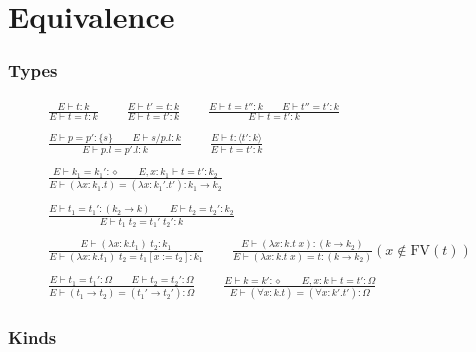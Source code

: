 \documentclass[twoside]{article}
\newcommand{\f}[1]{\mbox{#1}}
\begin{document}
\section{Equivalence}
\label{equivalence}

\subsubsection*{Types \hfill
{}
}

\begin{displaymath}
\begin{array}{c}
\displaystyle
\frac{
E \vdash t : k
}{
E \vdash t = t : k
}
\qquad
\frac{
E \vdash t' = t : k
}{
E \vdash t = t' : k
}
\qquad
\frac{
E \vdash t = t'' : k
\qquad
E \vdash t'' = t' : k
}{
E \vdash t = t' : k
}
\\\\\displaystyle
\frac{
E \vdash p = p' : \{s\}
\qquad
E \vdash s/p.l : k
}{
E \vdash p.l = p'.l : k
}
\qquad
\frac{
E \vdash t : \langle t':k\rangle
}{
E \vdash t = t' : k
}
\\\\\displaystyle
\frac{
E \vdash k_1 = k_1' : \diamond
\qquad
E,x:k_1 \vdash t = t' : k_2
}{
E \vdash (\lambda x:k_1.t) = (\lambda x:k_1'.t') : k_1\to k_2
}
\\\\\displaystyle
\frac{
E \vdash t_1 = t_1' : (k_2\to k)
\qquad
E \vdash t_2 = t_2' : k_2
}{
E \vdash t_1\;t_2 = t_1'\;t_2' : k
}
\\\\\displaystyle
\frac{
E \vdash (\lambda x:k.t_1)\;t_2 : k_1
}{
E \vdash (\lambda x:k.t_1)\;t_2 = t_1[x:=t_2] : k_1
}
\qquad
\frac{
E \vdash (\lambda x:k.t\;x) : (k\to k_2)
}{
E \vdash (\lambda x:k.t\;x) = t : (k\to k_2)
}(x \notin \f{FV}(t))
\\\\\displaystyle
\frac{
E \vdash t_1 = t_1' : \Omega
\qquad
E \vdash t_2 = t_2' : \Omega
}{
E \vdash (t_1\to t_2) = (t_1'\to t_2') : \Omega
}
\qquad
\frac{
E \vdash k = k' : \diamond
\qquad
E,x:k \vdash t = t' : \Omega
}{
E \vdash (\forall x:k.t) = (\forall x:k'.t') : \Omega
}
\end{array}
\end{displaymath}



\subsubsection*{Kinds \hfill
{}
}
\end{document}
